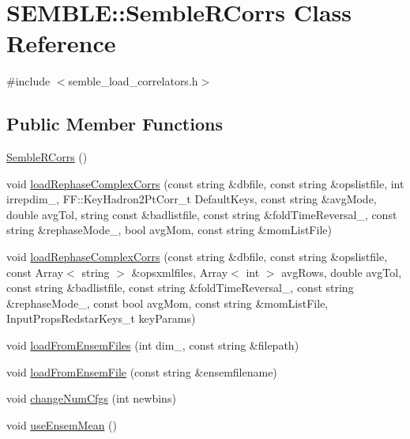 \hypertarget{classSEMBLE_1_1SembleRCorrs}{}\section{S\+E\+M\+B\+LE\+:\+:Semble\+R\+Corrs Class Reference}
\label{classSEMBLE_1_1SembleRCorrs}


{\ttfamily \#include $<$semble\+\_\+load\+\_\+correlators.\+h$>$}

\subsection*{Public Member Functions}
\begin{DoxyCompactItemize}
\item 
\mbox{\hyperlink{classSEMBLE_1_1SembleRCorrs_af1bf90ab982a17e2db5454fda91a1a55}{Semble\+R\+Corrs}} ()
\item 
void \mbox{\hyperlink{classSEMBLE_1_1SembleRCorrs_aae586006dab4a9da40e75f2ac09c30bc}{load\+Rephase\+Complex\+Corrs}} (const string \&dbfile, const string \&opslistfile, int irrepdim\+\_\+, F\+F\+::\+Key\+Hadron2\+Pt\+Corr\+\_\+t Default\+Keys, const string \&avg\+Mode, double avg\+Tol, string const \&badlistfile, const string \&fold\+Time\+Reversal\+\_\+, const string \&rephase\+Mode\+\_\+, bool avg\+Mom, const string \&mom\+List\+File)
\item 
void \mbox{\hyperlink{classSEMBLE_1_1SembleRCorrs_a90df6abc8a20c39a8f0d5c04ad8efc97}{load\+Rephase\+Complex\+Corrs}} (const string \&dbfile, const string \&opslistfile, const Array$<$ string $>$ \&opsxmlfiles, Array$<$ int $>$ avg\+Rows, double avg\+Tol, const string \&badlistfile, const string \&fold\+Time\+Reversal\+\_\+, const string \&rephase\+Mode\+\_\+, const bool avg\+Mom, const string \&mom\+List\+File, Input\+Props\+Redstar\+Keys\+\_\+t key\+Params)
\item 
void \mbox{\hyperlink{classSEMBLE_1_1SembleRCorrs_a0bf9a1942cfecded7e4decd08ee54dcf}{load\+From\+Ensem\+Files}} (int dim\+\_\+, const string \&filepath)
\item 
void \mbox{\hyperlink{classSEMBLE_1_1SembleRCorrs_a1695e747d8b6469c3bcf538cea18500b}{load\+From\+Ensem\+File}} (const string \&ensemfilename)
\item 
void \mbox{\hyperlink{classSEMBLE_1_1SembleRCorrs_aced86d0b621c0bd4f0a6a3535ac2b867}{change\+Num\+Cfgs}} (int newbins)
\item 
void \mbox{\hyperlink{classSEMBLE_1_1SembleRCorrs_ab8d8237902ed16cacac1910994db717b}{use\+Ensem\+Mean}} ()

\end{DoxyCompactItemize}
